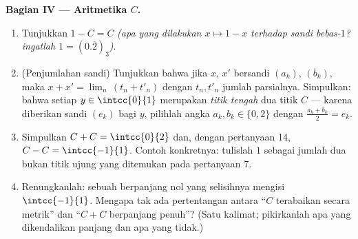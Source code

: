 \begin{problem}[{Soal akhir pekan --- \omterm{pb:b1:topology:1}{himpunan Cantor} sepertiga
tengah: panjang nol, takterbilang, sempurna, dan $C + C =
\intcc{0}{2}$}]
\medskip
\noindent\textbf{Bagian IV --- Aritmetika $C$.}
\begin{enumerate}[resume]
  \item Tunjukkan $1 - C = C$ \emph{(apa yang dilakukan $x \mapsto 1 - x$
        terhadap sandi bebas-$1$? ingatlah $1 = (0.\overline{2})_3$)}.
  \item (Penjumlahan sandi) Tunjukkan bahwa jika $x$, $x'$ bersandi
        $(a_k)$, $(b_k)$, maka $x + x' = \lim_n\,(t_n + t'_n)$
        dengan $t_n, t'_n$ jumlah parsialnya. Simpulkan: bahwa setiap $y
        \in \intcc{0}{1}$ merupakan \emph{titik tengah} dua titik
        $C$ --- karena diberikan sandi $(e_k)$ bagi $y$, pilihlah angka
        $a_k, b_k \in \{0, 2\}$ dengan $\frac{a_k + b_k}{2} =
        e_k$.
  \item Simpulkan $C + C = \intcc{0}{2}$ dan, dengan pertanyaan 14,
        $C - C = \intcc{-1}{1}$. Contoh konkretnya: tulislah $1$ sebagai
        jumlah dua bukan titik ujung yang ditemukan pada pertanyaan 7.
  \item Renungkanlah: sebuah  berpanjang nol yang  selisihnya mengisi
        $\intcc{-1}{1}$. Mengapa tak ada pertentangan antara
        ``$C$ terabaikan secara metrik'' dan ``$C + C$ berpanjang
        penuh''? (Satu kalimat; pikirkanlah apa yang dikendalikan panjang
        dan apa yang tidak.)
\end{enumerate}


\end{problem}
